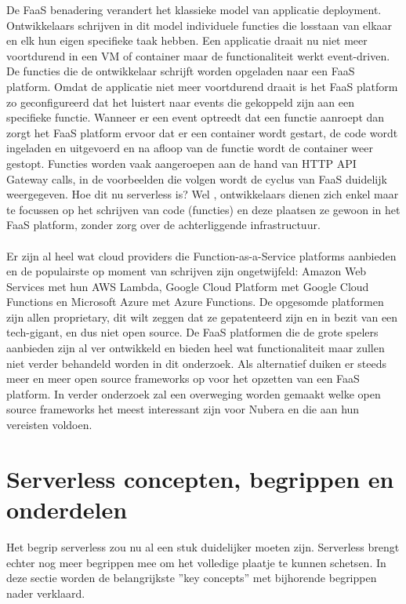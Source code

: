 De FaaS benadering verandert het klassieke model van applicatie deployment. Ontwikkelaars schrijven in dit model individuele functies die losstaan van elkaar en elk hun eigen specifieke taak hebben. Een applicatie draait nu niet meer voortdurend in een VM of container maar de functionaliteit werkt event-driven. De functies die de ontwikkelaar schrijft worden opgeladen naar een FaaS platform. Omdat de applicatie niet meer voortdurend draait is het FaaS platform zo geconfigureerd dat het luistert naar events die gekoppeld zijn aan een specifieke functie. Wanneer er een event optreedt dat een functie aanroept dan zorgt het FaaS platform ervoor dat er een container wordt gestart, de code wordt ingeladen en uitgevoerd en na afloop van de functie wordt de container weer gestopt. Functies worden vaak aangeroepen aan de hand van HTTP API Gateway calls, in de voorbeelden die volgen wordt de cyclus van FaaS duidelijk weergegeven. Hoe dit nu serverless is? Wel , ontwikkelaars dienen zich enkel maar te focussen op het schrijven van code (functies) en deze plaatsen ze gewoon in het FaaS platform, zonder zorg over de achterliggende infrastructuur.\autocite{Roberts2017}
\\\\
Er zijn al heel wat cloud providers die Function-as-a-Service platforms aanbieden en de populairste op moment van schrijven zijn ongetwijfeld: Amazon Web Services met hun AWS Lambda, Google Cloud Platform met Google Cloud Functions en Microsoft Azure met Azure Functions. De opgesomde platformen zijn allen proprietary,  dit wilt zeggen dat ze gepatenteerd zijn en in bezit van een tech-gigant, en dus niet open source. De FaaS platformen die de grote spelers aanbieden zijn al ver ontwikkeld en bieden heel wat functionaliteit maar zullen niet verder behandeld worden in dit onderzoek. Als alternatief duiken er steeds meer en meer open source frameworks op voor het opzetten van een FaaS platform. In verder onderzoek zal een overweging worden gemaakt welke  open source frameworks het meest interessant zijn voor Nubera en die aan hun vereisten voldoen.

\section{Serverless concepten, begrippen en onderdelen}
Het begrip serverless zou nu al een stuk duidelijker moeten zijn. Serverless brengt echter nog meer begrippen mee om het volledige plaatje te kunnen schetsen. In deze sectie worden de belangrijkste ''key concepts'' met bijhorende begrippen nader verklaard.

